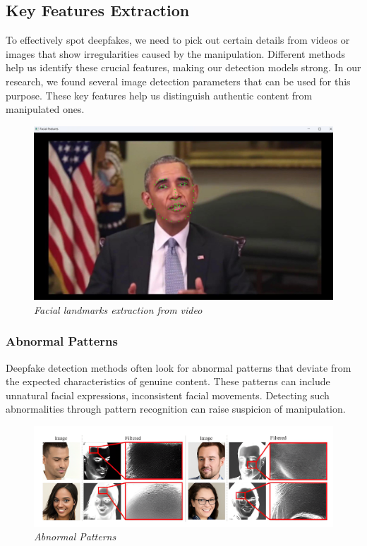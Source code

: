 \subsection{Key Features Extraction}

To effectively spot deepfakes, we need to pick out certain details from videos or images that show irregularities caused by the manipulation. Different methods help us identify these crucial features, making our detection models strong. In our research, we found several image detection parameters that can be used for this purpose. These key features help us distinguish authentic content from manipulated ones.
\begin{figure}[htbp]
    \centering
    \includegraphics[width= 5in ]{img/featureshighlight.jpg}
    \caption{\textit{Facial landmarks extraction from video}}
\end{figure}
\subsubsection{Abnormal Patterns}

Deepfake detection methods often look for abnormal patterns that deviate from the expected characteristics of genuine content. These patterns can include unnatural facial expressions, inconsistent facial movements. Detecting such abnormalities through pattern recognition can raise suspicion of manipulation.
\begin{figure}[htbp]
    \centering
    \includegraphics[width=5in]{img/abnormal_pattern.png}
    \caption{\textit{Abnormal Patterns}}
\end{figure}

